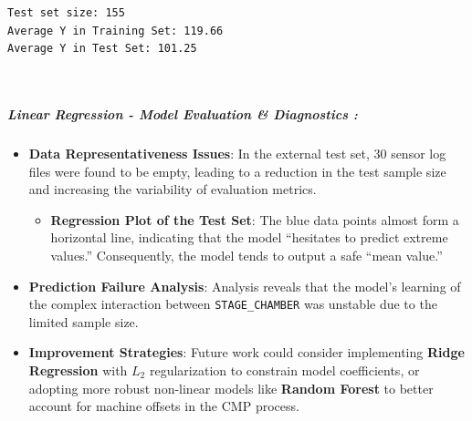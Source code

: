 \documentclass[11pt]{article}
\providecommand{\tightlist}{%
      \setlength{\itemsep}{0pt}\setlength{\parskip}{0pt}}
\begin{document}
    \begin{Verbatim}[commandchars=\\\{\}]
Test set size: 155
Average Y in Training Set: 119.66
Average Y in Test Set: 101.25
    \end{Verbatim}

    \begin{center}
    \end{center}
    { \hspace*{\fill} \\}
    
    \subparagraph{Linear Regression - Model Evaluation \& Diagnostics
:}\label{linear-regression---model-evaluation-diagnostics}

\begin{itemize}
\tightlist
\item
  \textbf{Data Representativeness Issues}: In the external test set, 30
  sensor log files were found to be empty, leading to a reduction in the
  test sample size and increasing the variability of evaluation metrics.

  \begin{itemize}
  \tightlist
  \item
    \textbf{Regression Plot of the Test Set}: The blue data points
    almost form a horizontal line, indicating that the model ``hesitates
    to predict extreme values.'' Consequently, the model tends to output
    a safe ``mean value.''
  \end{itemize}
\item
  \textbf{Prediction Failure Analysis}: Analysis reveals that the
  model's learning of the complex interaction between
  \texttt{STAGE\_CHAMBER} was unstable due to the limited sample size.
\item
  \textbf{Improvement Strategies}: Future work could consider
  implementing \textbf{Ridge Regression} with \(L_2\) regularization to
  constrain model coefficients, or adopting more robust non-linear
  models like \textbf{Random Forest} to better account for machine
  offsets in the CMP process.
\end{itemize}
\end{document}
